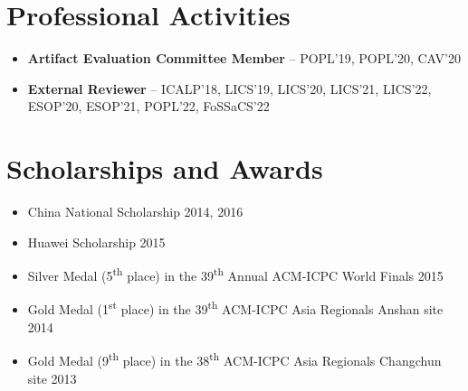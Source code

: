 \documentclass[11pt,letterpaper,roman]{moderncv}        %
\begin{document}
\section{Professional Activities}

\begin{itemize}
  \item \textbf{Artifact Evaluation Committee Member} -- POPL'19, POPL'20, CAV'20
  \item \textbf{External Reviewer} -- ICALP'18, LICS'19, LICS'20, LICS'21, LICS'22, ESOP'20, ESOP'21, POPL'22, FoSSaCS'22
\end{itemize}

%
%
%
%
%
%
%

\section{Scholarships and Awards}

\begin{itemize}
\item China National Scholarship \hfill 2014, 2016
\item Huawei Scholarship \hfill 2015

  \vspace{4pt}

  \item Silver Medal (5\textsuperscript{th} place) in the 39\textsuperscript{th} Annual ACM-ICPC World Finals \hfill 2015
  \item Gold Medal (1\textsuperscript{st} place) in the 39\textsuperscript{th} ACM-ICPC Asia Regionals Anshan site \hfill 2014
  \item Gold Medal (9\textsuperscript{th} place) in the 38\textsuperscript{th} ACM-ICPC Asia Regionals Changchun site \hfill 2013
\end{itemize}
\end{document}
